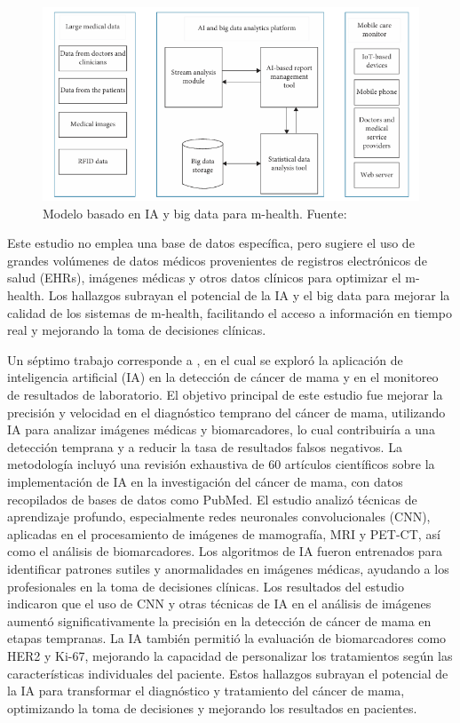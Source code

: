 \begin{figure}[H]
	\centering
	\includegraphics[width=\textwidth]{2/figures/MODELO.png}
	\caption{Modelo basado en IA y big data para m-health. Fuente: \cite{khan2020}}
	\label{11:fig}
\end{figure}

\vspace{0.5 cm}
Este estudio no emplea una base de datos específica, pero sugiere el uso de grandes volúmenes de datos médicos provenientes de registros electrónicos de salud (EHRs), imágenes médicas y otros datos clínicos para optimizar el m-health. Los hallazgos subrayan el potencial de la IA y el big data para mejorar la calidad de los sistemas de m-health, facilitando el acceso a información en tiempo real y mejorando la toma de decisiones clínicas.







Un séptimo  trabajo corresponde a \parencite{prevljak2024}, en el cual se exploró la aplicación de inteligencia artificial (IA) en la detección de cáncer de mama y en el monitoreo de resultados de laboratorio. El objetivo principal de este estudio fue mejorar la precisión y velocidad en el diagnóstico temprano del cáncer de mama, utilizando IA para analizar imágenes médicas y biomarcadores, lo cual contribuiría a una detección temprana y a reducir la tasa de resultados falsos negativos.
La metodología incluyó una revisión exhaustiva de 60 artículos científicos sobre la implementación de IA en la investigación del cáncer de mama, con datos recopilados de bases de datos como PubMed. El estudio analizó técnicas de aprendizaje profundo, especialmente redes neuronales convolucionales (CNN), aplicadas en el procesamiento de imágenes de mamografía, MRI y PET-CT, así como el análisis de biomarcadores. Los algoritmos de IA fueron entrenados para identificar patrones sutiles y anormalidades en imágenes médicas, ayudando a los profesionales en la toma de decisiones clínicas.
Los resultados del estudio indicaron que el uso de CNN y otras técnicas de IA en el análisis de imágenes aumentó significativamente la precisión en la detección de cáncer de mama en etapas tempranas. La IA también permitió la evaluación de biomarcadores como HER2 y Ki-67, mejorando la capacidad de personalizar los tratamientos según las características individuales del paciente. Estos hallazgos subrayan el potencial de la IA para transformar el diagnóstico y tratamiento del cáncer de mama, optimizando la toma de decisiones y mejorando los resultados en pacientes.



